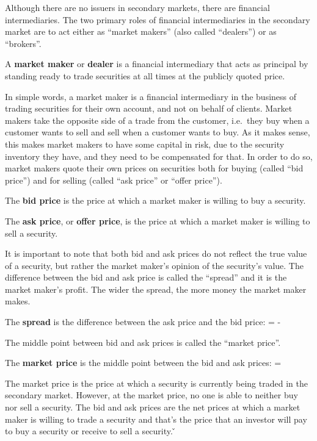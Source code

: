 Although there are no issuers in secondary markets, there are financial intermediaries. The two primary roles of
financial intermediaries in the secondary market are to act either as ``market makers'' (also called ``dealers'') or
as ``brokers''.

A \textbf{market maker} or \textbf{dealer} is a financial intermediary that acts as principal by standing ready to
trade securities at all times at the publicly quoted price.
\ed

In simple words, a market maker is a financial intermediary in the business of trading securities for their own
account, and not on behalf of clients. Market makers take the opposite side of a trade from the customer, i.e.\ they
buy when a customer wants to sell and sell when a customer wants to buy. As it makes sense, this makes market makers
to have some capital in risk, due to the security inventory they have, and they need to be compensated for that. In
order to do so, market makers quote their own prices on securities both for buying (called ``bid price'') and for
selling (called ``ask price'' or ``offer price'').

The \textbf{bid price} is the price at which a market maker is willing to buy a security.
\ed

The \textbf{ask price}, or \textbf{offer price}, is the price at which a market maker is willing to sell a security.
\ed

It is important to note that both bid and ask prices do not reflect the true value of a security, but rather the market
maker's opinion of the security's value. The difference between the bid and ask price is called the ``spread'' and it
is the market maker's profit. The wider the spread, the more money the market maker makes.

\bd[Spread]
The \textbf{spread} is the difference between the ask price and the bid price:
\bse
{} =  - 
\ese
\ed

The middle point between bid and ask prices is called the ``market price''.

The \textbf{market price} is the middle point between the bid and ask prices:
\bse
{} = 
\ese
\ed

The market price is the price at which a security is currently being traded in the secondary market. However, at the
market price, no one is able to neither buy nor sell a security. The bid and ask prices are the net prices at which a
market maker is willing to trade a security and that's the price that an investor will pay to buy a security or receive
to sell a security. \v

